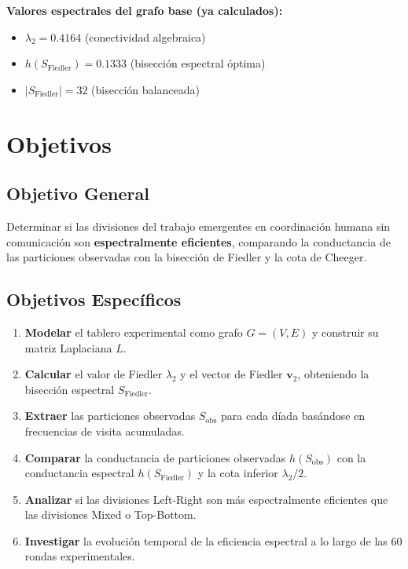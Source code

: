 \documentclass[conference]{IEEEtran}
\begin{document}
\textbf{Valores espectrales del grafo base (ya calculados):}
\begin{itemize}
    \item $\lambda_2 = 0.4164$ (conectividad algebraica)
    \item $h(S_{\text{Fiedler}}) = 0.1333$ (bisección espectral óptima)
    \item $|S_{\text{Fiedler}}| = 32$ (bisección balanceada)
\end{itemize}

\section{Objetivos}

\subsection{Objetivo General}

Determinar si las divisiones del trabajo emergentes en coordinación humana sin comunicación son \textbf{espectralmente eficientes}, comparando la conductancia de las particiones observadas con la bisección de Fiedler y la cota de Cheeger.

\subsection{Objetivos Específicos}

\begin{enumerate}
    \item \textbf{Modelar} el tablero experimental como grafo $G = (V, E)$ y construir su matriz Laplaciana $L$.
    
    \item \textbf{Calcular} el valor de Fiedler $\lambda_2$ y el vector de Fiedler $\mathbf{v}_2$, obteniendo la bisección espectral $S_{\text{Fiedler}}$.
    
    \item \textbf{Extraer} las particiones observadas $S_{\text{obs}}$ para cada díada basándose en frecuencias de visita acumuladas.
    
    \item \textbf{Comparar} la conductancia de particiones observadas $h(S_{\text{obs}})$ con la conductancia espectral $h(S_{\text{Fiedler}})$ y la cota inferior $\lambda_2/2$.
    
    \item \textbf{Analizar} si las divisiones Left-Right son más espectralmente eficientes que las divisiones Mixed o Top-Bottom.
    
    \item \textbf{Investigar} la evolución temporal de la eficiencia espectral a lo largo de las 60 rondas experimentales.
\end{enumerate}
\end{document}
